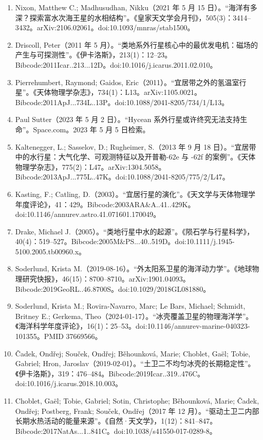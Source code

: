 \begin{enumerate}
\item Nixon, Matthew C.; Madhusudhan, Nikku（2021 年 5 月 15 日）。“海洋有多深？探索富水次海王星的水相结构”。《皇家天文学会月刊》，505(3)：3414–3432。arXiv:2106.02061。doi:10.1093/mnras/stab1500。
\item Driscoll, Peter（2011 年 5 月）。“类地系外行星核心中的最优发电机：磁场的产生与可探测性”。《伊卡洛斯》，213(1)：12–23。Bibcode:2011Icar..213...12D。doi:10.1016/j.icarus.2011.02.010。
\item Pierrehumbert, Raymond; Gaidos, Eric（2011）。“宜居带之外的氢温室行星”。《天体物理学杂志》，734(1)：L13。arXiv:1105.0021。Bibcode:2011ApJ...734L..13P。doi:10.1088/2041-8205/734/1/L13。
\item Paul Sutter（2023 年 5 月 2 日）。“Hycean 系外行星或许终究无法支持生命”。Space.com。2023 年 5 月 5 日检索。
\item Kaltenegger, L.; Sasselov, D.; Rugheimer, S.（2013 年 9 月 18 日）。“宜居带中的水行星：大气化学、可观测特征以及开普勒-62e 与 -62f 的案例”。《天体物理学杂志》，775(2)：L47。arXiv:1304.5058。Bibcode:2013ApJ...775L..47K。doi:10.1088/2041-8205/775/2/L47。
\item Kasting, F.; Catling, D.（2003）。“宜居行星的演化”。《天文学与天体物理学年度评论》，41：429。Bibcode:2003ARA&A..41..429K。doi:10.1146/annurev.astro.41.071601.170049。
\item Drake, Michael J.（2005）。“类地行星中水的起源”。《陨石学与行星科学》，40(4)：519–527。Bibcode:2005M&PS...40..519D。doi:10.1111/j.1945-5100.2005.tb00960.x。
\item Soderlund, Krista M.（2019-08-16）。“外太阳系卫星的海洋动力学”。《地球物理研究快报》，46(15)：8700–8710。arXiv:1901.04093。Bibcode:2019GeoRL..46.8700S。doi:10.1029/2018GL081880。
\item Soderlund, Krista M.; Rovira-Navarro, Marc; Le Bars, Michael; Schmidt, Britney E.; Gerkema, Theo（2024-01-17）。“冰壳覆盖卫星的物理海洋学”。《海洋科学年度评论》，16(1)：25–53。doi:10.1146/annurev-marine-040323-101355。PMID 37669566。
\item Čadek, Ondřej; Souček, Ondřej; Běhounková, Marie; Choblet, Gaël; Tobie, Gabriel; Hron, Jaroslav（2019-02-01）。“土卫二不均匀冰壳的长期稳定性”。《伊卡洛斯》，319：476–484。Bibcode:2019Icar..319..476C。doi:10.1016/j.icarus.2018.10.003。
\item Choblet, Gaël; Tobie, Gabriel; Sotin, Christophe; Běhounková, Marie; Čadek, Ondřej; Postberg, Frank; Souček, Ondřej（2017 年 12 月）。“驱动土卫二内部长期水热活动的能量来源”。《自然·天文学》，1(12)：841–847。Bibcode:2017NatAs...1..841C。doi:10.1038/s41550-017-0289-8。

\end{enumerate}
